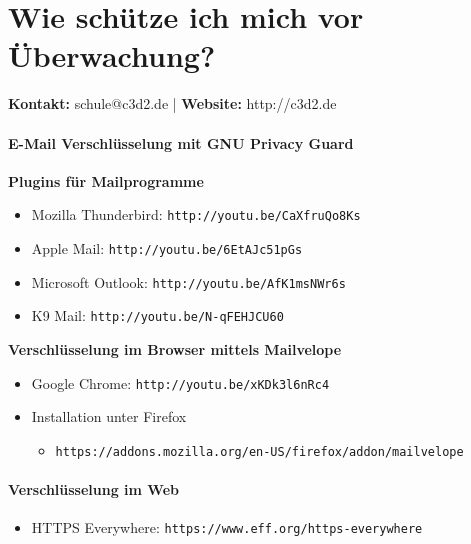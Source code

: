 \documentclass[a5paper]{scrartcl}
\begin{document}
\thispagestyle{empty}

\part*{Wie schütze ich mich vor Überwachung?}
\textbf{Kontakt:} schule@c3d2.de | \textbf{Website:} http://c3d2.de
\vspace{2mm}

\subsection*{E-Mail Verschlüsselung mit GNU Privacy Guard}
\textbf{Plugins für Mailprogramme}
\begin{itemize}
   \item Mozilla Thunderbird: \texttt{http://youtu.be/CaXfruQo8Ks}
   \item Apple Mail: \texttt{http://youtu.be/6EtAJc51pGs}  
   \item Microsoft Outlook: \texttt{http://youtu.be/AfK1msNWr6s} 
   \item K9 Mail: \texttt{http://youtu.be/N-qFEHJCU60} 
\end{itemize}
\textbf{Verschlüsselung im Browser mittels Mailvelope}
\begin{itemize}
   \item Google Chrome: \texttt{http://youtu.be/xKDk3l6nRc4}
   \item Installation unter Firefox
      \begin{itemize}
         \item[] \footnotesize{\texttt{https://addons.mozilla.org/en-US/firefox/addon/mailvelope}} 
      \end{itemize}
\end{itemize}

\subsection*{Verschlüsselung im Web}
\begin{itemize}
  \item HTTPS Everywhere: \texttt{https://www.eff.org/https-everywhere}
\end{itemize}
\end{document}
